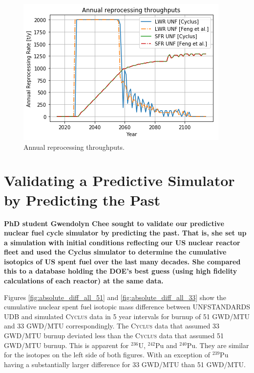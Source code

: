 \documentclass{article}
\newcommand{\Cyclus}{\textsc{Cyclus}\xspace}%
\begin{document}
\begin{figure}[htbp!]
    \begin{center}
            \includegraphics[width=\textwidth]{./rep.png}
    \end{center}
        \caption{Annual reprocessing throughputs.}
    \label{fig:rep}
\end{figure}

\FloatBarrier
\section*{Validating a Predictive Simulator by Predicting the Past \cite{chee_validation_2018}}

\textbf{PhD student Gwendolyn Chee sought to validate our predictive nuclear 
fuel cycle simulator by predicting the past. That is, she set up a simulation 
with initial conditions reflecting our US nuclear reactor fleet and used the 
Cyclus simulator to determine the cumulative isotopics of US spent fuel over 
the last many decades. She compared this to a database holding the DOE's best 
guess (using high fidelity calculations of each reactor) at the same data.}

Figures \ref{fig:absolute_diff_all_51} and \ref{fig:absolute_diff_all_33} show
the cumulative nuclear spent fuel isotopic mass difference between \gls{UNFSTANDARDS} 
\gls{UDB} and simulated \Cyclus data
in 5 year intervals for burnup of 51 GWD/MTU and 33 GWD/MTU correspondingly.
The \Cyclus data that assumed 33 GWD/MTU burnup deviated less than the
\Cyclus data that assumed 51 GWD/MTU burnup. This is apparent for $^{236}$U,
$^{242}$Pu and $^{240}$Pu. They are similar for the isotopes on the left side
of both figures. With an exception of $^{239}$Pu having a substantially larger
difference for 33 GWD/MTU than 51 GWD/MTU.
\end{document}
